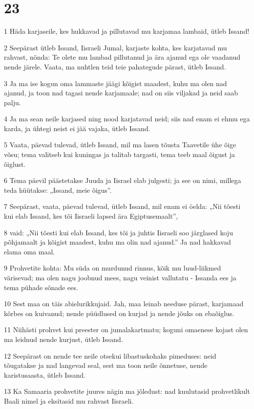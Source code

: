 \chapter{23}

\par 1 Häda karjaseile, kes hukkavad ja pillutavad mu karjamaa lambaid, ütleb Issand!
\par 2 Seepärast ütleb Issand, Iisraeli Jumal, karjaste kohta, kes karjatavad mu rahvast, nõnda: Te olete mu lambad pillutanud ja ära ajanud ega ole vaadanud nende järele. Vaata, ma nuhtlen teid teie pahategude pärast, ütleb Issand.
\par 3 Ja ma ise kogun oma lammaste jäägi kõigist maadest, kuhu ma olen nad ajanud, ja toon nad tagasi nende karjamaale; nad on siis viljakad ja neid saab palju.
\par 4 Ja ma sean neile karjased ning nood karjatavad neid; siis nad enam ei ehmu ega karda, ja ühtegi neist ei jää vajaka, ütleb Issand.
\par 5 Vaata, päevad tulevad, ütleb Issand, mil ma lasen tõusta Taavetile ühe õige võsu; tema valitseb kui kuningas ja talitab targasti, tema teeb maal õigust ja õiglust.
\par 6 Tema päevil päästetakse Juuda ja Iisrael elab julgesti; ja see on nimi, millega teda hüütakse: „Issand, meie õigus”.
\par 7 Seepärast, vaata, päevad tulevad, ütleb Issand, mil enam ei öelda: „Nii tõesti kui elab Issand, kes tõi Iisraeli lapsed ära Egiptusemaalt”,
\par 8 vaid: „Nii tõesti kui elab Issand, kes tõi ja juhtis Iisraeli soo järglased koju põhjamaalt ja kõigist maadest, kuhu ma olin nad ajanud.” Ja nad hakkavad elama oma maal.
\par 9 Prohvetite kohta: Mu süda on murdunud rinnus, kõik mu luud-liikmed värisevad; ma olen nagu joobnud mees, nagu veinist vallutatu - Issanda ees ja tema pühade sõnade ees.
\par 10 Sest maa on täis abielurikkujaid. Jah, maa leinab needuse pärast, karjamaad kõrbes on kuivanud; nende püüdlused on kurjad ja nende jõuks on ebaõiglus.
\par 11 Niihästi prohvet kui preester on jumalakartmatu; koguni omaenese kojast olen ma leidnud nende kurjust, ütleb Issand.
\par 12 Seepärast on nende tee neile otsekui libastuskohaks pimeduses: neid tõugatakse ja nad langevad seal, sest ma toon neile õnnetuse, nende karistusaasta, ütleb Issand.
\par 13 Ka Samaaria prohvetite juures nägin ma jõledust: nad kuulutasid prohvetlikult Baali nimel ja eksitasid mu rahvast Iisraeli.
